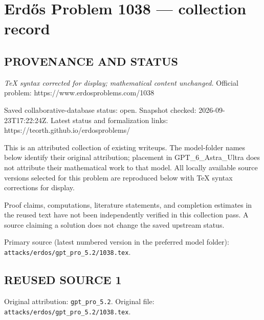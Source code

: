 \section*{Erd\H{o}s Problem 1038 --- collection record}

\subsection*{PROVENANCE AND STATUS}

\emph{TeX syntax corrected for display; mathematical content unchanged.}
Official problem: https://www.erdosproblems.com/1038

Saved collaborative-database status: open.
Snapshot checked: 2026-09-23T17:22:24Z.
Latest status and formalization links: https://teorth.github.io/erdosproblems/

This is an attributed collection of existing writeups. The model-folder names below identify their original attribution; placement in GPT\_6\_Astra\_Ultra does not attribute their mathematical work to that model. All locally available source versions selected for this problem are reproduced below with TeX syntax corrections for display.

Proof claims, computations, literature statements, and completion estimates in the reused text have not been independently verified in this collection pass. A source claiming a solution does not change the saved upstream status.

Primary source (latest numbered version in the preferred model folder): \texttt{attacks/erdos/gpt\_pro\_5.2/1038.tex}.

\subsection*{REUSED SOURCE 1}
Original attribution: \texttt{gpt\_pro\_5.2}.
Original file: \texttt{attacks/erdos/gpt\_pro\_5.2/1038.tex}.


